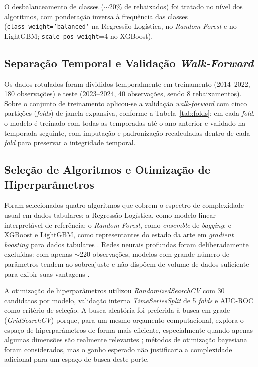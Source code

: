 \documentclass[
    article,
    12pt,
    oneside,
    a4paper,
    english,
    brazilian
    ]{abntex2}
\begin{document}
O desbalanceamento de classes ($\sim$20\% de rebaixados) foi tratado no nível dos algoritmos, com ponderação inversa à frequência das classes (\texttt{class\_weight='balanced'} na Regressão Logística, no \textit{Random Forest} e no LightGBM; \texttt{scale\_pos\_weight}=4 no XGBoost).

\subsection{Separação Temporal e Validação \textit{Walk-Forward}}

Os dados rotulados foram divididos temporalmente em treinamento (2014--2022, 180 observações) e teste (2023--2024, 40 observações, sendo 8 rebaixamentos). Sobre o conjunto de treinamento aplicou-se a validação \textit{walk-forward} com cinco partições (\textit{folds}) de janela expansiva, conforme a Tabela~\ref{tab:folds}: em cada \textit{fold}, o modelo é treinado com todas as temporadas até o ano anterior e validado na temporada seguinte, com imputação e padronização recalculadas dentro de cada \textit{fold} para preservar a integridade temporal.



\subsection{Seleção de Algoritmos e Otimização de Hiperparâmetros}

Foram selecionados quatro algoritmos que cobrem o espectro de complexidade usual em dados tabulares: a Regressão Logística, como modelo linear interpretável de referência; o \textit{Random Forest}, como \textit{ensemble} de \textit{bagging}; e XGBoost e LightGBM, como representantes do estado da arte em \textit{gradient boosting} para dados tabulares \cite{chen2016, ke2017}. Redes neurais profundas foram deliberadamente excluídas: com apenas $\sim$220 observações, modelos com grande número de parâmetros tendem ao sobreajuste e não dispõem de volume de dados suficiente para exibir suas vantagens \cite{geron2022}.

A otimização de hiperparâmetros utilizou \textit{RandomizedSearchCV} com 30 candidatos por modelo, validação interna \textit{TimeSeriesSplit} de 5 \textit{folds} e AUC-ROC como critério de seleção. A busca aleatória foi preferida à busca em grade (\textit{GridSearchCV}) porque, para um mesmo orçamento computacional, explora o espaço de hiperparâmetros de forma mais eficiente, especialmente quando apenas algumas dimensões são realmente relevantes \cite{bergstra2012}; métodos de otimização bayesiana foram considerados, mas o ganho esperado não justificaria a complexidade adicional para um espaço de busca deste porte.
\end{document}
